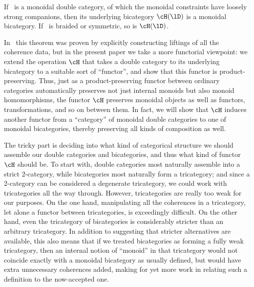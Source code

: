 \begin{thm}\label{thm:mondbl-monbi-intro}
  If \lD\ is a monoidal double category, of which the monoidal constraints have loosely strong companions, then its underlying bicategory $\cH(\lD)$ is a monoidal bicategory.  If \lD\ is braided
  or symmetric, so is $\cH(\lD)$.
\end{thm}

In~\cite{shulman:smbicat} this theorem was proven by explicitly constructing liftings of all the coherence data, but in the present paper we take a more functorial viewpoint:
we extend the operation $\cH$ that takes a double category to its underlying bicategory to a suitable sort of ``functor'', and show that this functor is product-preserving.
Thus, just as a product-preserving functor between ordinary categories automatically preserves not just internal monoids but also monoid homomorphisms, the functor $\cH$ preserves monoidal objects as well as functors, transformations, and so on between them.
In fact, we will show that $\cH$ induces another functor from a ``category'' of monoidal double categories to one of monoidal bicategories, thereby preserving all kinds of composition as well.

The tricky part is deciding into what kind of categorical structure we should assemble our double categories and bicategories, and thus what kind of functor $\cH$ should be.
To start with, double categories most naturally assemble into a strict 2-category, while bicategories most naturally form a tricategory; and since a 2-category can be considered a degenerate tricategory, we could work with tricategories all the way through.
However, tricategories are really too weak for our purposes.
On the one hand, manipulating all the coherences in a tricategory, let alone a functor between tricategories, is exceedingly difficult.
On the other hand, even the tricategory of bicategories is considerably stricter than an arbitrary tricategory.
In addition to suggesting that stricter alternatives are available, this also means that if we treated bicategories as forming a fully weak tricategory, then an internal notion of ``monoid'' in that tricategory would not coincide exactly with a monoidal bicategory as usually defined, but would have extra unnecessary coherences added, making for yet more work in relating such a definition to the now-accepted one.

